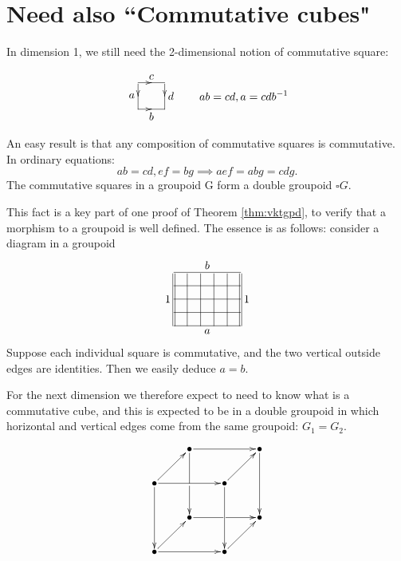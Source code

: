 \documentclass{elsarticle}
\def\bu{\bullet}
\def\xybiglabels{\def\labelstyle{\textstyle}}
\begin{document}
\section{Need also ``Commutative cubes"}\label{sec:commcub}
In dimension 1, we still need the 2-dimensional notion of commutative square:

\begin{equation}
\xybiglabels \vcenter{\xymatrix@M=0pt{\ar @{-}  [r]|\tip ^c\ar @{-}  [d]|\tip _a  &  \ar @{-}  [d]|\tip ^d \\
\ar @{-}  [r]|\tip _b & }} \qquad ab = cd ,   a = cdb^{-1}
\end{equation}




An easy result is that any composition of commutative squares is commutative.  In ordinary
equations:
$$ab = cd, ef = bg  \implies aef = abg = cdg.$$
The commutative squares in a groupoid G form a double groupoid $\square G$.

This fact is a key part of one proof of Theorem \ref{thm:vktgpd}, to verify that a morphism to a groupoid
is well defined. The essence is as follows: consider a diagram in a groupoid
\begin{equation}
\xybiglabels \vcenter{\xymatrix@M=0pt@=1pc{\ar @{-} [rrrrr]^b \ar @{=} [dddd]_1 &\ar @{-} [dddd]&\ar @{-} [dddd]&\ar @{-} [dddd]&\ar @{-} [dddd]& \ar @{=} [dddd] ^1 \\
\ar @{-} [rrrrr] &&&&&\\
\ar @{-} [rrrrr] &&&&&\\
\ar @{-} [rrrrr] &&&&& \\
\ar @{-} [rrrrr]_a &&&&& }}
\end{equation}
Suppose each individual square is commutative, and the two vertical outside edges are identities.
Then we easily deduce $a = b$.

For the next dimension we therefore expect to need to know what is a commutative cube,
and this is expected to be in a double groupoid in which horizontal and vertical edges come
from the same groupoid:  $G_1=G_2$.

\begin{equation}{{\objectmargin{0.1pc} \diagram &  \bu\rrto \xline '[1,0]
[2,0]|>\tip &&\bu\ddto\\\bu \urto \rrto \ddto &&\bu \urto \ddto &
\\&\bu \xline'[0,1] [0,2]|>\tip && \bu \\ \bu\rrto \urto &&\bu \urto
& \enddiagram }}\end{equation}
\end{document}
